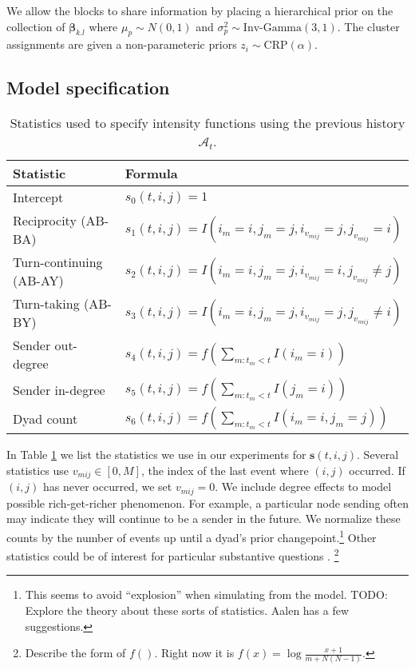We allow the blocks to share information by placing a hierarchical prior on the collection of $\boldsymbol{\beta}_{k.l}$ where $\mu_p \sim N(0,1)$ and $\sigma_p^2 \sim \mbox{Inv-Gamma}(3,1)$.
The cluster assignments are given a non-parameteric priors $z_i \sim \mbox{CRP}(\alpha)$.

\subsection{Model specification}

\begin{table}[t]
\footnotesize
\center
\begin{tabular}{|l|l|}
\hline
Statistic & Formula \\
\hline
\hline
Intercept& $s_{0}(t,i,j) = 1$\\
Reciprocity (AB-BA)& $s_{1}(t,i,j) = I(i_m=i,j_m=j,i_{v_{mij}}=j,j_{v_{mij}}=i)$\\
Turn-continuing (AB-AY)& $s_{2}(t,i,j) =  I(i_m=i,j_m=j,i_{v_{mij}}=i,j_{v_{mij}}\ne j)$\\
Turn-taking (AB-BY)&$s_{3}(t,i,j) = I(i_m=i,j_m=j,i_{v_{mij}}=j,j_{v_{mij}}\ne i)$\\
Sender out-degree& $s_{4}(t,i,j) = f(\sum_{m:t_m<t} I(i_m=i) )$\\
Sender in-degree& $s_{5}(t,i,j) = f(\sum_{m:t_m<t} I(j_m=i) )$\\
Dyad count& $s_{6}(t,i,j) = f(\sum_{m:t_m<t} I(i_m=i,j_m=j) )$\\
\hline
\end{tabular}
\label{tab:stats}
\caption{Statistics used to specify intensity functions using the previous history $\mathcal{A}_t$.}
\end{table}



In Table \ref{tab:stats} we list the statistics we use in our experiments for  $\mathbf{s}(t,i,j)$.
Several statistics use $v_{mij} \in [0,M]$, the index of the last event where $(i,j)$ occurred.  %
If $(i,j)$ has never occurred, we set $v_{mij}=0$.  We include degree effects to model possible rich-get-richer phenomenon.
For example, a particular node sending often may indicate they will continue to be a sender in the future.
We normalize these counts by the number of events up until a dyad's prior changepoint.\footnote{This seems to avoid ``explosion'' when simulating from the model.  TODO: Explore the theory about these sorts of statistics.  Aalen has a few suggestions.}
Other statistics could be of interest for particular substantive questions \cite{Butts2008,Vu2011}.  \footnote{Describe the form of $f()$.  Right now it is $f(x) = \log \frac{x+1}{m + N(N-1)}$.}

